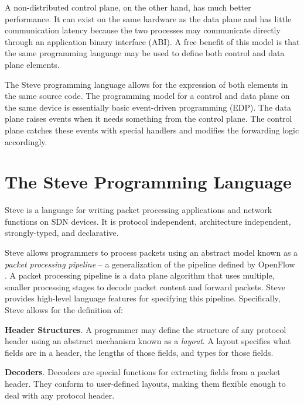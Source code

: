 A non-distributed control plane, on the other hand, has much
better performance.
It can exist on the
same hardware as the data plane and has little communication latency
because the two processes may communicate directly through an application
binary interface (ABI).
A free benefit of this model is that the same programming language may
be used to define both control and data plane elements.

The Steve programming language allows for the expression of both elements in the
same source code. 
The programming model for a control and data plane on the same device
is essentially basic event-driven programming (EDP).
The data plane raises events when it needs something from the control plane.
The control plane catches these events with special handlers and modifies the
forwarding logic accordingly. 

\section{The Steve Programming Language}

Steve is a language for writing packet processing applications
and network functions on SDN devices.
It is protocol independent, architecture independent, strongly-typed,
and declarative.

Steve allows programmers to process packets using an abstract model
known as a \emph{packet processing pipeline} -- a generalization
of the pipeline defined by OpenFlow \cite{openflow_spec}.
A packet processing pipeline is a data plane algorithm that
uses multiple, smaller processing stages to decode packet content and forward packets.
Steve provides high-level language features for specifying this pipeline.
Specifically, Steve allows for the definition of:

\textbf{Header Structures}.
A programmer may define the structure of any protocol header using an abstract
mechanism known as a \emph{layout}.
A layout specifies what fields are in a header, the lengths of those fields,
and types for those fields.

\textbf{Decoders}. Decoders are special functions for extracting fields from a
packet header. They conform to user-defined layouts, making them flexible enough
to deal with any protocol header.

%

